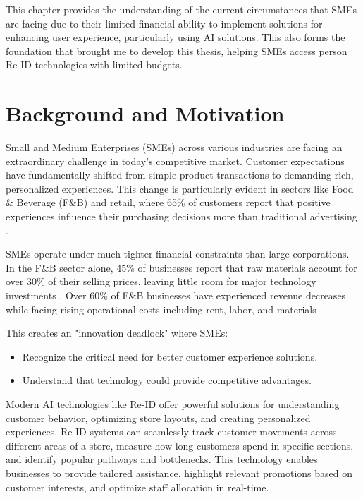 \documentclass[../main.tex]{subfiles}
\begin{document}
This chapter provides the understanding of the current circumstances that SMEs are facing due to their limited financial ability to implement solutions for enhancing user experience, particularly using AI solutions. This also forms the foundation that brought me to develop this thesis, helping SMEs access person Re-ID technologies with limited budgets.


\section{Background and Motivation}
\label{sec:motivation}

Small and Medium Enterprises (SMEs) across various industries are facing an extraordinary challenge in today's competitive market. Customer expectations have fundamentally shifted from simple product transactions to demanding rich, personalized experiences. This change is particularly evident in sectors like Food \& Beverage (F\&B) and retail, where 65\% of customers report that positive experiences influence their purchasing decisions more than traditional advertising \cite{customer_experience}.

SMEs operate under much tighter financial constraints than large corporations. In the F\&B sector alone, 45\% of businesses report that raw materials account for over 30\% of their selling prices, leaving little room for major technology investments \cite{customer_experience2}. Over 60\% of F\&B businesses have experienced revenue decreases while facing rising operational costs including rent, labor, and materials \cite{customer_experience3}.

This creates an "innovation deadlock" where SMEs:
\begin{itemize}
    \item Recognize the critical need for better customer experience solutions.
    \item Understand that technology could provide competitive advantages.
\end{itemize}

Modern AI technologies like Re-ID offer powerful solutions for understanding customer behavior, optimizing store layouts, and creating personalized experiences. Re-ID systems can seamlessly track customer movements across different areas of a store, measure how long customers spend in specific sections, and identify popular pathways and bottlenecks. This technology enables businesses to provide tailored assistance, highlight relevant promotions based on customer interests, and optimize staff allocation in real-time.
\end{document}

